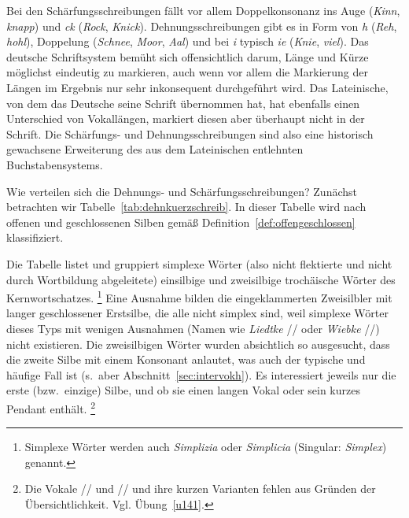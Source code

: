 

Bei den Schärfungsschreibungen fällt vor allem Doppelkonsonanz ins Auge (\textit{Kinn}, \textit{knapp}) und \textit{ck} (\textit{Rock}, \textit{Knick}).
Dehnungsschreibungen gibt es in Form von \textit{h} (\textit{Reh}, \textit{hohl}), Doppelung (\textit{Schnee}, \textit{Moor}, \textit{Aal}) und bei \textit{i} typisch \textit{ie} (\textit{Knie}, \textit{viel}).
Das deutsche Schriftsystem bemüht sich offensichtlich darum, Länge und Kürze möglichst eindeutig zu markieren, auch wenn vor allem die Markierung der Längen im Ergebnis nur sehr inkonsequent durchgeführt wird.
Das Lateinische, von dem das Deutsche seine Schrift übernommen hat, hat ebenfalls einen Unterschied von Vokallängen, markiert diesen aber überhaupt nicht in der Schrift.
Die Schärfungs- und Dehnungsschreibungen sind also eine historisch gewachsene Erweiterung des aus dem Lateinischen entlehnten Buchstabensystems.

Wie verteilen sich die Dehnungs- und Schärfungsschreibungen?
Zunächst betrachten wir Tabelle~\ref{tab:dehnkuerzschreib}.
In dieser Tabelle wird nach offenen und geschlossenen Silben gemäß Definition~\ref{def:offengeschlossen} klassifiziert.


\newpage

Die Tabelle listet und gruppiert simplexe Wörter (also nicht flektierte und nicht durch Wortbildung abgeleitete) einsilbige und zweisilbige trochäische Wörter des Kernwortschatzes.%
\footnote{Simplexe Wörter werden auch \textit{Simplizia} oder \textit{Simplicia} (Singular: \textit{Simplex}) genannt.}
Eine Ausnahme bilden die eingeklammerten Zweisilbler mit langer geschlossener Erstsilbe, die alle nicht simplex sind, weil simplexe Wörter dieses Typs mit wenigen Ausnahmen (\zB Namen wie \textit{Liedtke} // oder \textit{Wiebke} //) nicht existieren.\label{abs:wiebke}
Die zweisilbigen Wörter wurden absichtlich so ausgesucht, dass die zweite Silbe mit einem Konsonant anlautet, was auch der typische und häufige Fall ist (s.\ aber Abschnitt~\ref{sec:intervokh}).
Es interessiert jeweils nur die erste (bzw.\ einzige) Silbe, und ob sie einen langen Vokal oder sein kurzes Pendant enthält.%
\footnote{Die Vokale /\textipa{\o}/ und // und ihre kurzen Varianten fehlen aus Gründen der Übersichtlichkeit.
Vgl. Übung~\ref{u141}.}

